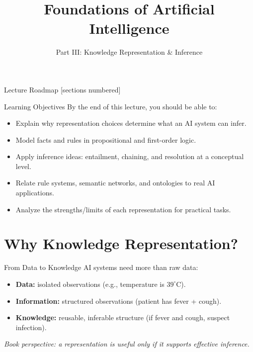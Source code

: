 \documentclass[10pt]{beamer}
\title{Foundations of Artificial Intelligence}
\subtitle{Part III: Knowledge Representation \& Inference}
\institute{Department of Computer Science}
\date{}
\begin{document}
\maketitle

\begin{frame}{Lecture Roadmap}
    [sections numbered]
    \tableofcontents[hideallsubsections]
\end{frame}

\begin{frame}{Learning Objectives}
    By the end of this lecture, you should be able to:
    \begin{itemize}
        \item Explain why representation choices determine what an AI system can infer.
        \item Model facts and rules in propositional and first-order logic.
        \item Apply inference ideas: entailment, chaining, and resolution at a conceptual level.
        \item Relate rule systems, semantic networks, and ontologies to real AI applications.
        \item Analyze the strengths/limits of each representation for practical tasks.
    \end{itemize}
\end{frame}

\section{Why Knowledge Representation?}

\begin{frame}{From Data to Knowledge}
    AI systems need more than raw data:
    \begin{itemize}
        \item \textbf{Data:} isolated observations (e.g., temperature is $39^{\circ}\mathrm{C}$).
        \item \textbf{Information:} structured observations (patient has fever + cough).
        \item \textbf{Knowledge:} reusable, inferable structure (if fever and cough, suspect infection).
    \end{itemize}
    \vspace{0.2cm}
    \textit{Book perspective: a representation is useful only if it supports effective inference.}
\end{frame}
\end{document}
